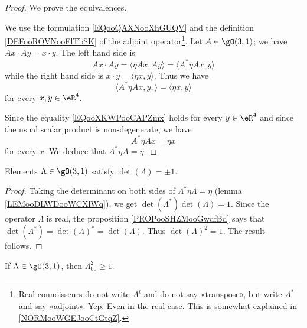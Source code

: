\begin{proof}
    We prove the equivalences.


    We use the formulation \eqref{EQooQAXNooXhGUQV} and the definition \ref{DEFooROVNooFlTbSK} of the adjoint operator\footnote{Real connoisseurs do not write \( A^t\) and do not say «transpose», but write \( A^*\) and say «adjoint». Yep. Even in the real case. This is somewhat explained in \ref{NORMooWGEJooCtGtqZ}.}. Let \( A\in \gO(3,1)\); we have \( Ax\cdot Ay=x\cdot y\). The left hand side is
    \begin{equation}
        Ax\cdot Ay=\langle \eta A x, Ay\rangle =\langle A^*\eta A x, y\rangle 
    \end{equation}
    while the right hand side is \( x\cdot y=\langle \eta x, y\rangle \). Thus we have
    \begin{equation}        \label{EQooXKWPooCAPZmx}
        \langle A^*\eta Ax,y, \rangle =\langle \eta x, y\rangle 
    \end{equation}
    for every \( x,y\in \eR^4\).

    Since the equality \eqref{EQooXKWPooCAPZmx} holds for every \( y\in \eR^4\) and since the usual scalar product is non-degenerate, we have
    \begin{equation}
        A^*\eta Ax=\eta x
    \end{equation}
    for every \( x\). We deduce that \( A^*\eta A=\eta\).
\end{proof}

\begin{lemma}
    Elements \( \Lambda\in\gO(3,1)\) satisfy \( \det(\Lambda)=\pm1\).
\end{lemma}

\begin{proof}
    Taking the determinant on both sides of \( \Lambda^*\eta\Lambda=\eta\) (lemma \ref{LEMooDLWDooWCXlWq}), we get \( \det(\Lambda^*)\det(\Lambda)=1\). Since the operator \( \Lambda\) is real, the proposition \ref{PROPooSHZMooGwdfBd} says that \( \det(\Lambda^*)=\det(\Lambda)^*=\det(\Lambda)\). Thus \( \det(\Lambda)^2=1\). The result follows.
\end{proof}

\begin{lemma}
    If \( \Lambda\in \gO(3,1)\), then \( \Lambda_{00}^2\geq 1\).
\end{lemma}

